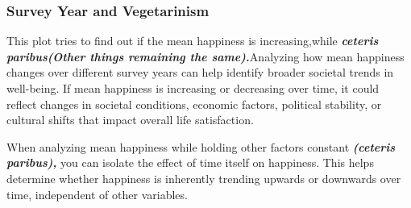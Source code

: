 \documentclass[
]{article}
\begin{document}
\subsubsection{Survey Year and
Vegetarinism}\label{survey-year-and-vegetarinism}

This plot tries to find out if the mean happiness is increasing,while
\textbf{\emph{ceteris paribus(Other things remaining the
same).}}Analyzing how mean happiness changes over different survey years
can help identify broader societal trends in well-being. If mean
happiness is increasing or decreasing over time, it could reflect
changes in societal conditions, economic factors, political stability,
or cultural shifts that impact overall life satisfaction.

When analyzing mean happiness while holding other factors constant
\textbf{\emph{(ceteris paribus),}} you can isolate the effect of time
itself on happiness. This helps determine whether happiness is
inherently trending upwards or downwards over time, independent of other
variables.
\end{document}
